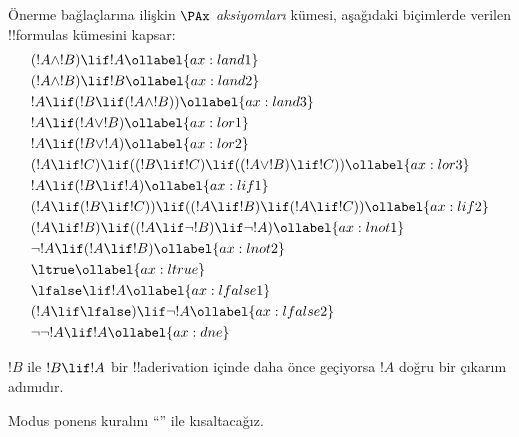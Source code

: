 

      {}
      {}


\begin{defn}[Aksiyomlar]
Önerme bağlaçlarına ilişkin $\PAx$ \emph{aksiyomları} kümesi, aşağıdaki
biçimlerde verilen !!{formula}s kümesini kapsar:
\begin{align}
  & (!A \land !B) \lif !A \ollabel{ax:land1}\\
  & (!A \land !B) \lif !B \ollabel{ax:land2}\\
  & !A \lif (!B \lif (!A \land !B)) \ollabel{ax:land3}\\
  & !A \lif (!A \lor !B) \ollabel{ax:lor1}\\
  & !A \lif (!B \lor !A) \ollabel{ax:lor2}\\
  & (!A \lif !C) \lif ((!B \lif !C) \lif ((!A \lor !B) \lif !C)) \ollabel{ax:lor3}\\
  & !A \lif (!B \lif !A) \ollabel{ax:lif1}\\
  & (!A \lif (!B \lif !C)) \lif ((!A \lif !B) \lif (!A \lif !C)) \ollabel{ax:lif2}\\
  & (!A \lif !B) \lif ((!A \lif \lnot !B) \lif \lnot !A) \ollabel{ax:lnot1}\\
  & \lnot !A \lif (!A \lif !B) \ollabel{ax:lnot2}\\
  & \ltrue \ollabel{ax:ltrue}\\
  & \lfalse \lif !A \ollabel{ax:lfalse1}\\
  & (!A \lif \lfalse) \lif \lnot !A \ollabel{ax:lfalse2}\\
  & \lnot\lnot !A \lif !A \ollabel{ax:dne}
\end{align}
\end{defn}

\begin{defn}
  $!B$ ile $!B \lif !A$ bir !!a{derivation} içinde daha önce geçiyorsa $!A$
  doğru bir çıkarım adımıdır.
\end{defn}

Modus ponens kuralını ``\MP'' ile kısaltacağız.

